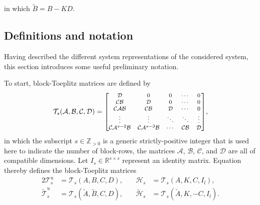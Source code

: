 in which $\tilde{B}=B-KD$.
%
%
%
\subsection{Definitions and notation}\label{sec:notation}
Having described the different system representations of the considered system, this section introduces some useful preliminary notation.

To start, block-Toeplitz matrices are defined by
\begin{align}\label{eqn:blockToeplitz} 
\mathcal{T}_s(\mathcal{A},\mathcal{B},\mathcal{C},\mathcal{D}) =\scriptsize{
	\begin{bmatrix}
		\mathcal{D}         & 0         & 0      & \cdots  & 0\\
		\mathcal{C}\mathcal{B}        & \mathcal{D}         & 0      & \cdots  & 0\\
		\mathcal{C}\mathcal{A}\mathcal{B}       & \mathcal{C}\mathcal{B}        & \mathcal{D}      & \cdots & 0\\
		\vdots    &  \vdots & \ddots & \ddots & \vdots\\
		\mathcal{C}\mathcal{A}^{s-2}\mathcal{B} & \mathcal{C}\mathcal{A}^{s-3}\mathcal{B} & \cdots  & \mathcal{C}\mathcal{B}     & \mathcal{D}
	\end{bmatrix}},
\end{align}
in which the subscript $s\in\mathbb{Z}_{>0}$ is a generic strictly-positive integer that is used here to indicate the number of block-rows, the matrices $\mathcal{A}$, $\mathcal{B}$, $\mathcal{C}$, and $\mathcal{D}$ are all of compatible dimensions. Let ${I_s\in\mathbb{R}^{s\times s}}$ represent an identity matrix. Equation~ thereby defines the block-Toeplitz matrices
\begin{alignat*}{2}
\mathcal{T}_s^\mathrm{u}&=\mathcal{T}_s(A,B,C,D),\quad  &\mathcal{H}_s&=\mathcal{T}_s(A,K,C,I_l),\\
\widetilde{\mathcal{T}}_s^\mathrm{u}&=\mathcal{T}_s(\tilde{A},\tilde{B},C,D),\quad  &\widetilde{\mathcal{H}}_s&=\mathcal{T}_s(\tilde{A},K,-C,I_l).
\end{alignat*}

